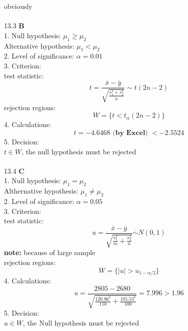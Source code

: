 \documentclass[a4paper]{ctexart}    %
\begin{document}
	obviously \\ \\
	13.3 \quad \textbf{B} \\
	1. Null hypothesis: $ \mu_1 \geq \mu_2 $ \\
	Alternative hypothesis: $ \mu_1 < \mu_2 $ \\
	2. Level of significance: $ \alpha = 0.01 $ \\
	3. Criterion: \\
	test statistic: 
	\begin{equation*}
		t = \frac{\bar{x} - \bar{y}}{\sqrt{\frac{s_1^2 + s_2^2}{n}}} \sim t(2n - 2)
	\end{equation*}
	rejection regions:
	\begin{equation*}
		W = \{t < t_{\alpha}(2n-2)\}
	\end{equation*}
	4. Calculations: \\
	\begin{equation*}
		t = -4.6468\textbf{ (by Excel) } < -2.5524
	\end{equation*}
	5. Decision: \\
	$ t \in W $, the null hypothesis must be rejected \\ \\
	13.4 \quad \textbf{C} \\
	1. Null hypothesis: $ \mu_1 = \mu_2 $ \\
	Althernative hypothesis: $ \mu_1 \neq \mu_2 $ \\
	2. Level of significance: $ \alpha = 0.05 $ \\
	3. Criterion: \\
	test statistic:
	\begin{equation*}
		u = \frac{\bar{x} - \bar{y}}{\sqrt{\frac{s_1^2}{m} + \frac{s_2^2}{n}}} \overset{\cdot}{\sim} N(0, 1)
	\end{equation*} 
	\textbf{note:} because of large sample \\
	rejection regions: \\
	\begin{equation*}
		W = \{|u| > u_{1-\alpha / 2}\}
	\end{equation*}
	4. Calculations: \\
	\begin{equation*}
		u = \frac{2805 - 2680}{\sqrt{\frac{120.96^2}{110} + \frac{105.53^2}{100}}} = 7.996 > 1.96
	\end{equation*}
	5. Decision: \\
	$ u \in W $, the Null hypothesis must be rejected \\ \\
\end{document}
